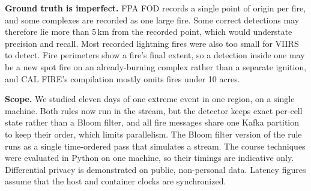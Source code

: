 \documentclass[10pt,journal,compsoc]{IEEEtran}
\begin{document}
\textbf{Ground truth is imperfect.} FPA FOD records a single point of origin per fire, and some complexes are recorded as one large fire. Some correct detections may therefore lie more than 5\,km from the recorded point, which would understate precision and recall. Most recorded lightning fires were also too small for VIIRS to detect. Fire perimeters show a fire's final extent, so a detection inside one may be a new spot fire on an already-burning complex rather than a separate ignition, and CAL FIRE's compilation mostly omits fires under 10 acres.

\textbf{Scope.} We studied eleven days of one extreme event in one region, on a single machine. Both rules now run in the stream, but the detector keeps exact per-cell state rather than a Bloom filter, and all fire messages share one Kafka partition to keep their order, which limits parallelism. The Bloom filter version of the rule runs as a single time-ordered pass that simulates a stream. The course techniques were evaluated in Python on one machine, so their timings are indicative only. Differential privacy is demonstrated on public, non-personal data. Latency figures assume that the host and container clocks are synchronized.

\end{document}
